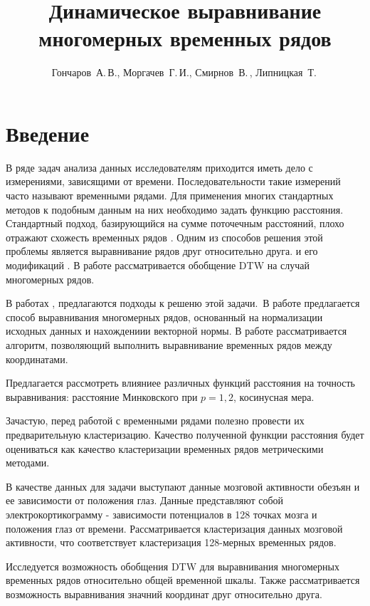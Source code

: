 \documentclass[12pt,twoside]{article}
\title
        {Динамическое выравнивание многомерных временных рядов}
\author
        {Гончаров~А.\,В., Моргачев~Г.\,И., Смирнов~В.\,, Липницкая~Т.\,} %
\begin{document}
    \maketitle
    \section{Введение}

        В ряде задач анализа данных исследователям приходится иметь дело с измерениями, зависящими от времени. Последовательности такие измерений часто называют временными рядами.
        Для применения многих стандартных методов к подобным данным на них необходимо задать функцию расстояния.  
        Стандартный подход, базирующийся на сумме поточечным расстояний, плохо отражают схожесть временных рядов \cite{01f4ab11a9ff49ff909094a135dcfe33}.
        Одним из способов решения этой проблемы является выравнивание рядов друг относительно друга.
        \cite{Keogh01derivativedynamic} и его модификаций \cite{journals/ida/SalvadorC07}.
        В работе рассматривается обобщение DTW на случай многомерных рядов.
        
        В работах \cite{Holt2007}, \cite{Sanguansat2012MultipleMS} предлагаются подходы к решеню этой задачи.\
        В работе \cite{Holt2007} предлагается способ выравнивания многомерных рядов, основанный на нормализации исходных данных и нахождениии векторной нормы.
        В работе \cite{Sanguansat2012MultipleMS} рассматривается алгоритм, позволяющий выполнить выравнивание временных рядов между координатами.
        
        Предлагается рассмотреть влияниее различных функций расстояния на точность выравнивания: расстояние Минковского при $p = 1, 2$, косинусная мера.
        
        Зачастую, перед работой с временными рядами полезно провести их предварительную кластеризацию. Качество полученной функции расстояния будет оцениваться как качество кластеризации временных рядов метрическими методами.
        
        В качестве данных для задачи выступают данные мозговой активности обезъян и ее зависимости от положения глаз. Данные представляют собой электрокортикограмму - зависимости потенциалов в 128 точках мозга и положения глаз от времени. Рассматривается кластеризация данных мозговой активности, что соответствует кластеризация 128-мерных временных рядов.
        
        Исследуется возможность обобщения DTW для выравнивания многомерных временных рядов относительно общей временной шкалы.
        Также рассматривается возможность выравнивания значний координат друг относительно друга.
        
\end{document}
